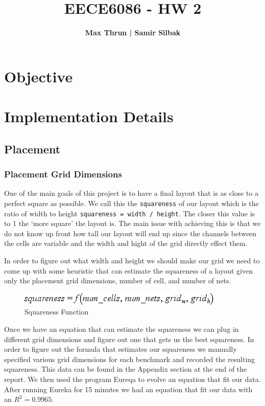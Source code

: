 \documentclass[10pt]{article}
\title{
    \vspace{2in}
    \textmd{\textbf{EECE6086 - HW 2}}\\
    \vspace{4in}
}
\author{\textbf{Max Thrun | Samir Silbak}}
\begin{document}
\maketitle
\newpage
\section{Objective}

\section{Implementation Details}

\subsection{Placement}

    \subsubsection{Placement Grid Dimensions}

        One of the main goals of this project is to have a final layout that is
        as close to a perfect square as possible. We call this the
        \texttt{squareness} of our layout which is the ratio of width to height
        \texttt{squareness = width / height}.  The closer this value is to 1
        the `more square' the layout is.  The main issue with achieving this is
        that we do not know up front how tall our layout will end up since the
        channels between the cells are variable and the width and hight of the grid
        directly effect them.

        In order to figure out what width and height we should make our grid we need
        to come up with some heuristic that can estimate the squareness of a layout
        given only the placement grid dimensions, number of cell, and number of nets.

        \begin{figure}[H]
            \centering
            \includegraphics{./square_f.png}
            \caption{Squareness Function}
        \end{figure}

        Once we have an equation that can estimate the squareness we can plug
        in different grid dimensions and figure out one that gets us the best
        squareness. In order to figure out the formula that estimates our
        squareness we manually specified various grid dimensions for each
        benchmark and recorded the resulting squareness. This data can be found
        in the Appendix section at the end of the report. We then used the
        program Eureqa to evolve an equation that fit our data. After running
        Eureka for 15 minutes we had an equation that fit our data with an $
        R^{2} =  0.9965 $.
\end{document}
